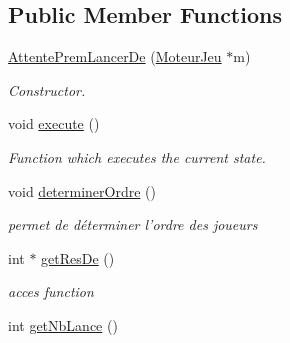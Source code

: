 \subsection*{Public Member Functions}
\begin{DoxyCompactItemize}
\item 
\hypertarget{class_attente_prem_lancer_de_ab30b9c3014ec9fa2722a72edba9a2b73}{
\hyperlink{class_attente_prem_lancer_de_ab30b9c3014ec9fa2722a72edba9a2b73}{AttentePremLancerDe} (\hyperlink{class_moteur_jeu}{MoteurJeu} $\ast$m)}
\label{class_attente_prem_lancer_de_ab30b9c3014ec9fa2722a72edba9a2b73}

\begin{DoxyCompactList}\small\item\em Constructor. \item\end{DoxyCompactList}\item 
\hypertarget{class_attente_prem_lancer_de_a3f4c31cf56fffe3bda17a9214166bd2f}{
void \hyperlink{class_attente_prem_lancer_de_a3f4c31cf56fffe3bda17a9214166bd2f}{execute} ()}
\label{class_attente_prem_lancer_de_a3f4c31cf56fffe3bda17a9214166bd2f}

\begin{DoxyCompactList}\small\item\em Function which executes the current state. \item\end{DoxyCompactList}\item 
\hypertarget{class_attente_prem_lancer_de_a76d529c687104162c9df99488b213560}{
void \hyperlink{class_attente_prem_lancer_de_a76d529c687104162c9df99488b213560}{determinerOrdre} ()}
\label{class_attente_prem_lancer_de_a76d529c687104162c9df99488b213560}

\begin{DoxyCompactList}\small\item\em permet de déterminer l'ordre des joueurs \item\end{DoxyCompactList}\item 
\hypertarget{class_attente_prem_lancer_de_a7050ee4b3b428d4a754dbfc5b0536cee}{
int $\ast$ \hyperlink{class_attente_prem_lancer_de_a7050ee4b3b428d4a754dbfc5b0536cee}{getResDe} ()}
\label{class_attente_prem_lancer_de_a7050ee4b3b428d4a754dbfc5b0536cee}

\begin{DoxyCompactList}\small\item\em acces function \item\end{DoxyCompactList}\item 
\hypertarget{class_attente_prem_lancer_de_afec5132af663ff21e3ef13f2478bd752}{
int \hyperlink{class_attente_prem_lancer_de_afec5132af663ff21e3ef13f2478bd752}{getNbLance} ()}
\label{class_attente_prem_lancer_de_afec5132af663ff21e3ef13f2478bd752}


\end{DoxyCompactItemize}
